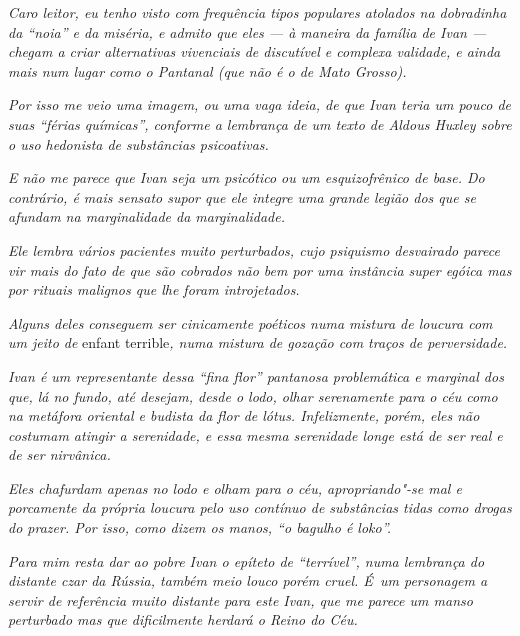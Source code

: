 \emph{Caro leitor, eu tenho visto com frequência tipos populares
atolados na dobradinha da ``noia'' e da miséria, e admito que eles --- à
maneira da família de Ivan --- chegam a criar alternativas vivenciais de
discutível e complexa validade, e ainda mais num lugar como o Pantanal
(que não é o de Mato Grosso).}

\emph{Por isso me veio uma imagem, ou uma vaga ideia, de que Ivan teria
um pouco de suas ``férias químicas'', conforme a lembrança de um texto
de Aldous Huxley sobre o uso hedonista de substâncias psicoativas.}

\emph{E não me parece que Ivan seja um psicótico ou um esquizofrênico de
base. Do contrário, é mais sensato supor que ele integre uma grande
legião dos que se afundam na marginalidade da marginalidade.}

\emph{Ele lembra vários pacientes muito perturbados, cujo psiquismo
desvairado parece vir mais do fato de que são cobrados não bem por uma
instância super egóica mas por rituais malignos que lhe foram
introjetados.}

\emph{Alguns deles conseguem ser cinicamente poéticos numa mistura de
loucura com um jeito de} enfant terrible\emph{, numa mistura de gozação com
traços de perversidade.}

\emph{Ivan é um representante dessa ``fina flor'' pantanosa problemática
e marginal dos que, lá no fundo, até desejam, desde o lodo, olhar
serenamente para o céu como na metáfora oriental e budista da flor de
lótus. Infelizmente, porém, eles não costumam atingir a serenidade, e
essa mesma serenidade longe está de ser real e de ser nirvânica.}

\emph{Eles chafurdam apenas no lodo e olham para o céu, apropriando"-se
mal e porcamente da própria loucura pelo uso contínuo de substâncias
tidas como drogas do prazer. Por isso, como dizem os manos, ``o bagulho
é loko''.}

\emph{Para mim resta dar ao pobre Ivan o epíteto de ``terrível'', numa
lembrança do distante czar da Rússia, também meio louco porém cruel. É~um personagem a servir de referência muito distante para este Ivan, que me
parece um manso perturbado mas que dificilmente herdará o Reino do Céu.}
\endgroup